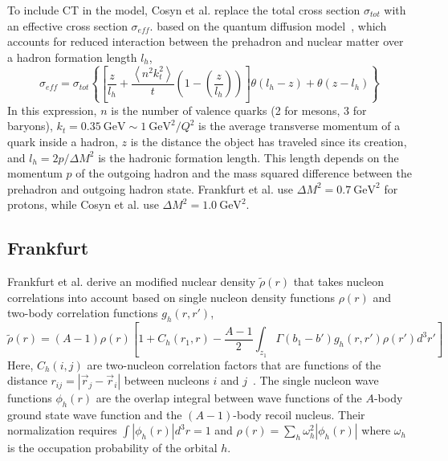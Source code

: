 To include CT in the model, Cosyn et al. replace
the total cross section $\sigma_{tot}$
with
an effective cross section $\sigma_{eff}$.
based on the quantum diffusion model~\cite{Farrar_1988},
which accounts for reduced interaction between the prehadron and nuclear matter
over a hadron formation length $l_h$,
\begin{equation}
    \sigma_{eff} = \sigma_{tot}
    \left\{
        \left[\frac{z}{l_h} +
               \frac{\left\langle n^{2} k_{t}^{2}\right\rangle}{t} \left(1-\left(\frac{z}{l_h}\right)\right)
        \right]
        \theta\left(l_h-z\right) +
        \theta\left(z-l_h\right)
    \right\}
\end{equation}
In this expression,
$n$ is the number of valence quarks (2 for mesons, 3 for baryons),
$k_t=\SI{0.35}{\giga\electronvolt}\sim \SI{1}{\giga\electronvolt\squared}/Q^2$
is the average transverse momentum of a quark inside a hadron,
$z$ is the distance the object has traveled since its creation,
and
$l_h=2p/\Delta M^2$ is the hadronic formation length.
This length depends on
the momentum $p$ of the outgoing hadron
and
the mass squared difference between the prehadron and outgoing hadron state.
Frankfurt et al. use $\Delta M^2 = \SI{0.7}{\giga\electronvolt\squared}$
for protons, while
Cosyn et al. use $\Delta M^2 = \SI{1.0}{\giga\electronvolt\squared}$.

\subsection{Frankfurt}

Frankfurt et al. derive an modified nuclear density $\tilde{\rho}(r)$ that
takes nucleon correlations into account based on single nucleon density
functions $\rho(r)$ and two-body correlation functions $g_h(r,r')$,
\begin{equation}
    \tilde{\rho}(r)
        = (A-1) \rho(r)
          \left[
               1 + C_h(r_1,r) - \frac{A-1}{2} \int_{z_1} \Gamma(b_1-b')g_h(r,r')\rho(r')d^3r'
          \right]
\end{equation}
Here, $C_h(i,j)$ are two-nucleon correlation factors that are functions of the
distance $r_{ij}=|\vec{r}_j-\vec{r}_i|$ between nucleons $i$ and
$j$~\cite{Weise_1972}.
The single nucleon wave functions $\phi_h(r)$ are the overlap integral between
wave functions of the $A$-body ground state wave function and the $(A-1)$-body
recoil nucleus.
Their normalization requires $\int|\phi_h(r)|d^3r=1$ and
$\rho(r) = \sum_h \omega_h^2 \left| \phi_h(r) \right|$ where $\omega_h$ is the
occupation probability of the orbital $h$.

